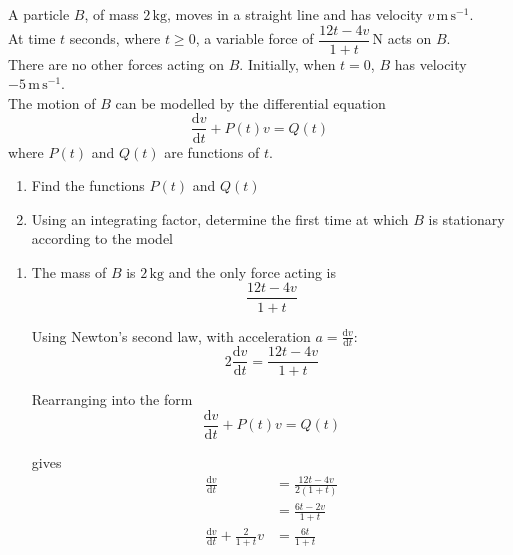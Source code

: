 \documentclass[leqno]{article}
\begin{document}
\djsFrontMatter
\begin{enumerate}[
  label=\textbf{\arabic*.},
  leftmargin=*,
  topsep=0pt,
  partopsep=0pt,
  parsep=0pt
]

\questionitem

A particle $B$, of mass $2\,\mathrm{kg}$, moves in a straight line and has velocity $v\,\mathrm{m\,s^{-1}}$. \\

At time $t$ seconds, where $t\ge 0$, a variable force of $\dfrac{12t-4v}{1+t}\,\mathrm{N}$ acts on $B$.\\

There are no other forces acting on $B$. Initially, when $t=0$, $B$ has velocity $-5\,\mathrm{m\,s^{-1}}$. \\

The motion of $B$ can be modelled by the differential equation
\[
\frac{\mathrm{d}v}{\mathrm{d}t}+P(t)v=Q(t)
\]
where $P(t)$ and $Q(t)$ are functions of $t$. \\

\begin{enumerate}[label=\textbf{(\alph*)}]
  \item Find the functions $P(t)$ and $Q(t)$  \\
  \item Using an integrating factor, determine the first time at which $B$ is stationary according to the model  \\
\end{enumerate}

\vspace*{10pt}

\begin{djsSolution}
\begin{enumerate}[label=\textbf{(\alph*)}]
  \item The mass of $B$ is $2\,\mathrm{kg}$ and the only force acting is
  \[
  \frac{12t-4v}{1+t}
  \]

  Using Newton's second law, with acceleration $a=\frac{\mathrm{d}v}{\mathrm{d}t}$:
  \[
  2\frac{\mathrm{d}v}{\mathrm{d}t} = \frac{12t-4v}{1+t}
  \]

  Rearranging into the form
  \[
  \frac{\mathrm{d}v}{\mathrm{d}t}+P(t)v=Q(t)
  \]

  gives
  \begin{align*}
  \frac{\mathrm{d}v}{\mathrm{d}t} &= \frac{12t-4v}{2(1+t)} \\
  &= \frac{6t-2v}{1+t} \\
  \frac{\mathrm{d}v}{\mathrm{d}t}+\frac{2}{1+t}v &= \frac{6t}{1+t}
  \end{align*}


\end{enumerate}
\end{djsSolution}
\end{enumerate}
\end{document}

